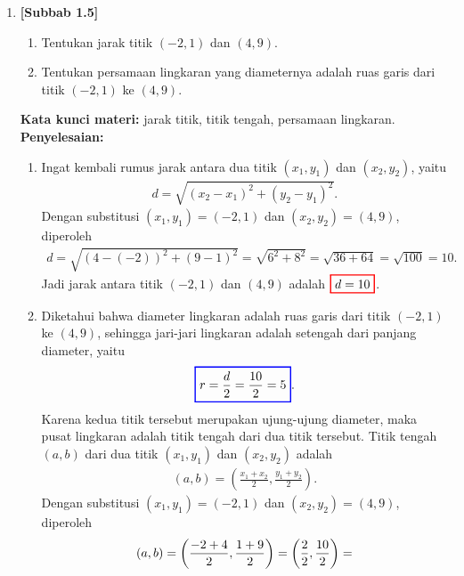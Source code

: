 \documentclass[10pt,openany,a4paper]{article}
\theoremstyle{definition}
\theoremstyle{definition}
\theoremstyle{plain}
\newenvironment{jawab}[2][tes]{%
\par\noindent\textbf{Kata kunci materi:} #1.\\
\textbf{Penyelesaian:} #2%
}{}
\begin{document}
\begin{enumerate}
    \item \textbf{[Subbab 1.5]} \begin{enumerate}
        \item Tentukan jarak titik $(-2,1)$ dan $(4,9)$.
        \item Tentukan persamaan lingkaran yang diameternya adalah ruas garis dari titik $(-2,1)$ ke $(4,9)$.
    \end{enumerate}
    \begin{jawab}[jarak titik, titik tengah, persamaan lingkaran]{
        \begin{enumerate}
            \item Ingat kembali rumus jarak antara dua titik $(x_1,y_1)$ dan $(x_2,y_2)$, yaitu
            \begin{align*}
                d = \sqrt{(x_2-x_1)^2+(y_2-y_1)^2}.
            \end{align*}
            Dengan substitusi $(x_1,y_1)=(-2,1)$ dan $(x_2,y_2)=(4,9)$, diperoleh
            \begin{align*}
                d = \sqrt{(4-(-2))^2+(9-1)^2}= \sqrt{6^2+8^2}= \sqrt{36+64}= \sqrt{100}= 10.
            \end{align*}
            Jadi jarak antara titik $(-2,1)$ dan $(4,9)$ adalah $\colorlet{oldcolor}{.}
        \color{red}
        \setlength{\fboxrule}{1pt} \boxed{\color{oldcolor}d = 10}\color{oldcolor}$.
            \item Diketahui bahwa diameter lingkaran adalah ruas garis dari titik $(-2,1)$ ke $(4,9)$, sehingga jari-jari lingkaran adalah setengah dari panjang diameter, yaitu
            \begin{align*}
                \colorlet{oldcolor}{.}
        \color{blue}
        \setlength{\fboxrule}{1pt} \boxed{\color{oldcolor}r = \frac{d}{2} = \frac{10}{2} = 5}\color{oldcolor}.
            \end{align*}
            Karena kedua titik tersebut merupakan ujung-ujung diameter, maka pusat lingkaran adalah titik tengah dari dua titik tersebut. Titik tengah $(a,b)$ dari dua titik $(x_1,y_1)$ dan $(x_2,y_2)$ adalah
            \begin{align*}
                (a,b) = \left(\frac{x_1+x_2}{2},\frac{y_1+y_2}{2}\right).
            \end{align*}
            Dengan substitusi $(x_1,y_1)=(-2,1)$ dan $(x_2,y_2)=(4,9)$, diperoleh
            \begin{align*}
                (a,b) = \left(\frac{-2+4}{2}, \frac{1+9}{2}\right) = \left(\frac{2}{2}, \frac{10}{2}\right) = \colorlet{oldcolor}{.}

\end{align*}
\end{enumerate}}
\end{jawab}
\end{enumerate}
\end{document}
